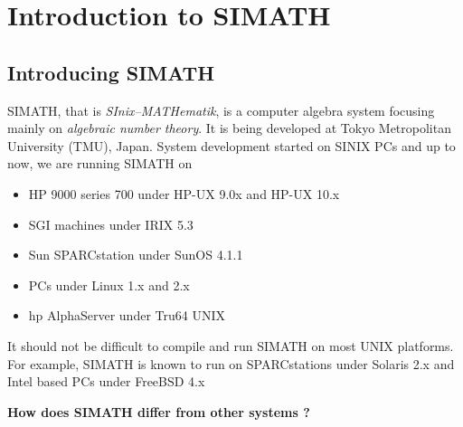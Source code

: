 % 
% 

\chapter{Introduction to  SIMATH}



\section{Introducing SIMATH} 
SIMATH, that is {\em SInix--MATHematik\/}, is a computer algebra 
system focusing mainly on {\em algebraic number theory\/}.  
It is being developed at Tokyo Metropolitan University (TMU), Japan.
System development started on SINIX PCs and
up to now, we are running SIMATH on
\begin{itemize}
\item{} HP 9000 series 700 under HP-UX 9.0x and HP-UX 10.x
\item{} SGI machines under IRIX 5.3
\item{} Sun SPARCstation under SunOS 4.1.1
\item{} PCs under Linux 1.x and 2.x
\item{} hp AlphaServer under Tru64 UNIX
\end{itemize}
It should not be difficult to compile and run SIMATH on most UNIX
platforms. For example, SIMATH is known to run on SPARCstations under
Solaris 2.x and Intel based PCs under FreeBSD 4.x

\newpage

{\bf How does SIMATH differ from other systems ?}  

